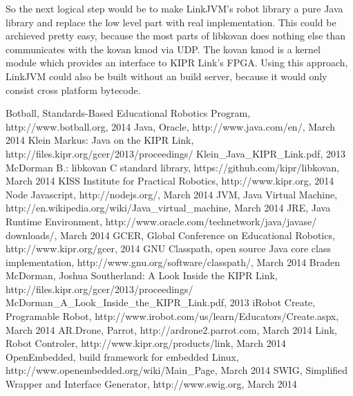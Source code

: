 \documentclass{juniorjournal}
\begin{document}
So the next logical step would be to make LinkJVM's robot library a pure Java\cite{Java} library and replace the low level part with real implementation.
This could be archieved pretty easy, because the most parts of libkovan\cite{libkovan} does nothing else than communicates with the kovan kmod via UDP.
The kovan kmod is a kernel module which provides an interface to KIPR\cite{KIPR} Link's\cite{link} FPGA.
Using this approach, LinkJVM could also be built without an build server, because it would only consist cross platform bytecode.

\begin{thebibliography}{500} %
  Botball, Standards-Based Educational Robotics Program,
  http://www.botball.org, 2014
  Java, Oracle,
  http://www.java.com/en/, March 2014
  Klein Markus: \frqq Java on the KIPR Link\flqq  ,
  http://files.kipr.org/gcer/2013/proceedings/
  Klein\_Java\_KIPR\_Link.pdf, 2013
  McDorman B.: libkovan C standard library,
  https://github.com/kipr/libkovan, March 2014
  KISS Institute for Practical Robotics,
  http://www.kipr.org, 2014
  Node Javascript,
  http://nodejs.org/, March 2014
  JVM, Java Virtual Machine,
  http://en.wikipedia.org/wiki/Java\_virtual\_machine, March 2014
  JRE, Java Runtime Environment,
  http://www.oracle.com/technetwork/java/javase/
  downloads/, March 2014
  GCER, Global Conference on Educational Robotics,
  http://www.kipr.org/gcer, 2014
  GNU Classpath, open source Java core class implementation,
  http://www.gnu.org/software/classpath/, March 2014
  Braden McDorman, Joshua Southerland: \frqq A Look Inside the KIPR Link\flqq  ,
  http://files.kipr.org/gcer/2013/proceedings/
  McDorman\_A\_Look\_Inside\_the\_KIPR\_Link.pdf, 2013
  iRobot Create, Programable Robot,
  http://www.irobot.com/us/learn/Educators/Create.aspx, March 2014
  AR.Drone, Parrot,
  http://ardrone2.parrot.com, March 2014
  Link, Robot Controler,
  http://www.kipr.org/products/link, March 2014
  OpenEmbedded, build framework for embedded Linux,
  http://www.openembedded.org/wiki/Main\_Page, March 2014
  SWIG, Simplified Wrapper and Interface Generator,
  http://www.swig.org, March 2014
\end{thebibliography}
\end{document}
